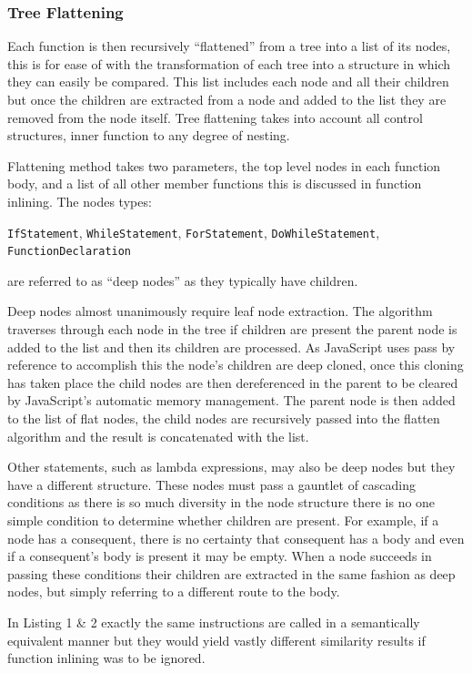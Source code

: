 \documentclass[jou,apacite]{apa6}
\begin{document}
\subsubsection{Tree Flattening}
Each function is then recursively “flattened” from a tree into a list of its nodes, this is for ease of with the transformation of each tree into a structure in which they can easily be compared. This list includes each node and all their children but once the children are extracted from a node and added to the list they are removed from the node itself. Tree flattening takes into account all control structures, inner function to any degree of nesting. 

Flattening method takes two parameters, the top level nodes in each function body, and a list of all other member functions this is discussed in function inlining. The nodes types:

\texttt{IfStatement}, \texttt{WhileStatement}, \texttt{ForStatement}, \texttt{DoWhileStatement}, \texttt{FunctionDeclaration}

 are referred to as “deep nodes” as they typically have children.

Deep nodes almost unanimously require leaf node extraction. The algorithm traverses through each node in the tree if children are present the parent node is added to the list and then its children are processed. As JavaScript uses pass by reference to accomplish this the node’s children are deep cloned, once this cloning has taken place the child nodes are then dereferenced in the parent to be cleared by JavaScript’s automatic memory management. The parent node is then added to the list of flat nodes, the child nodes are recursively passed into the flatten algorithm and the result is concatenated with the list. 

Other statements, such as lambda expressions, may also be deep nodes but they have a different structure. These nodes must pass a gauntlet of cascading conditions as there is so much diversity in the node structure there is no one simple condition to determine whether children are present. For example, if a node has a consequent, there is no certainty that consequent has a body and even if a consequent's body is present it may be empty. When a node succeeds in passing these conditions their children are extracted in the same fashion as deep nodes, but simply referring to a different route to the body. 

In Listing 1 \& 2 exactly the same instructions are called in a semantically equivalent manner but they would yield vastly different similarity results if function inlining was to be ignored. 
\end{document}
